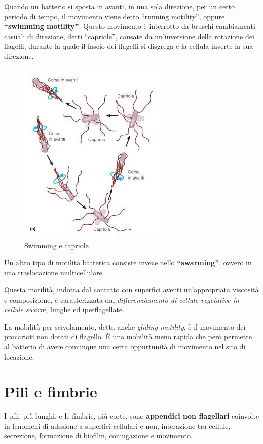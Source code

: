 \documentclass[11pt]{book}
\begin{document}
Quando un batterio si sposta in avanti, in una sola direzione, per un certo periodo di tempo, il movimento viene detto ``running motility'', oppure \textbf{``swimming motility''}. Questo movimento è interrotto da bruschi cambiamenti casuali di direzione, detti ``capriole'', causate da un'inversione della rotazione dei flagelli, durante la quale il fascio dei flagelli si disgrega e la cellula inverte la sua direzione.

\clearpage
\begin{figure}[htp]
\centering
\includegraphics[scale=0.6]{img/Swimming e capriole.png}
\caption{Swimming e capriole}
\label{}
\end{figure}

Un altro tipo di motilità batterica  consiste invece nello \textbf{``swarming''}, ovvero in una traslocazione multicellulare.

Questa motilità, indotta dal contatto con superfici aventi un'appropriata viscosità e composizione, è caratterizzata dal \emph{differenziamento di cellule vegetative in cellule swarm}, lunghe ed iperflagellate.

La mobilità per scivolamento, detta anche \emph{gliding motility}, è il movimento dei procarioti \underline{non} dotati di flagello.
\`E una mobilità meno rapida che però permette al batterio di avere comunque una certa oppurtunità di movimento nel sito di locazione.


\section{Pili e fimbrie}
I pili, più lunghi, e le fimbrie, più corte, sono \textbf{appendici non flagellari} coinvolte in fenomeni di adesione a superfici cellulari e non, interazione tra cellule, secrezione, formazione di biofilm, coniugazione e movimento.
\end{document}
